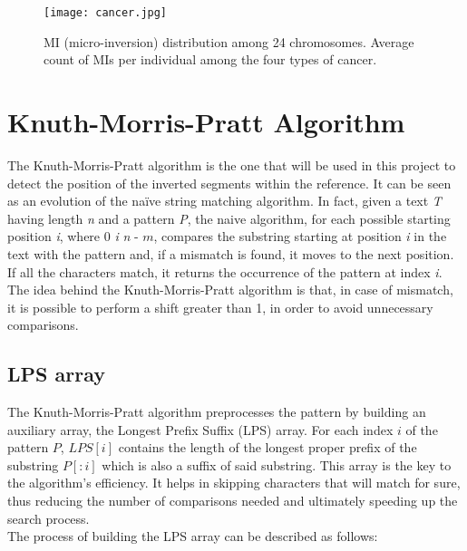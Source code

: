 \begin{figure}[h]

  \centering
    \texttt{[image: cancer.jpg]}

  \caption{MI (micro-inversion) distribution among 24 chromosomes.  Average count of MIs per individual among the four types of cancer.}
  \label{fig:cancer}
\end{figure}
\newpage
\section{Knuth-Morris-Pratt Algorithm}

The Knuth-Morris-Pratt \cite{knuth_fast_1977} algorithm is the one that will be used in this project to detect the position of the inverted segments within the reference. It can be seen as an evolution of the naïve string matching algorithm. In fact, given a text \textit{T} having length \textit{n} and a pattern \textit{P}, the naive algorithm, for each possible starting position \textit{i}, where 0 \leq \textit{i} \leq \textit{n} - \( m \), compares the substring starting at position \textit{i} in the text with the pattern and, if a mismatch is found, it moves to the next position. If all the characters match, it returns the occurrence of the pattern at index \textit{i}. \\
The idea behind the Knuth-Morris-Pratt algorithm is that, in case of mismatch, it is possible to perform a shift greater than 1, in order to avoid unnecessary comparisons. 

\subsection{LPS array}
The Knuth-Morris-Pratt algorithm preprocesses the pattern by building an auxiliary array, the Longest Prefix Suffix (LPS) array. For each index \( i \) of the pattern \( P \), \( LPS[i] \) contains the length of the longest proper prefix of the substring \( P[:i] \) which is also a suffix of said substring. This array is the key to the algorithm’s efficiency. It helps in skipping characters that will match for sure, thus reducing the number of comparisons needed and ultimately speeding up the search process.  \\
The process of building the LPS array can be described as follows:

